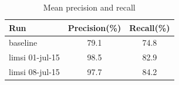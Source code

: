 \documentclass{acm_proc_article-me}
\begin{document}
\begin{table}[ht]
  \centering
  \begin{tabular}{|l|c|c|}
    \hline
	Run 				& Precision(\%)	& Recall(\%)		\\
	\hline
	\hline
	baseline			& 79.1			& 74.8			\\
	\hline
	limsi 01-jul-15 	& 98.5			& 82.9			\\
	limsi 08-jul-15 	& 97.7			& 84.2			\\
  	\hline
  \end{tabular}
  \caption{Mean precision and recall}
  \label{tab:precions_and_recall}
\end{table}

%
%
%
%
%
%
%
\end{document}
